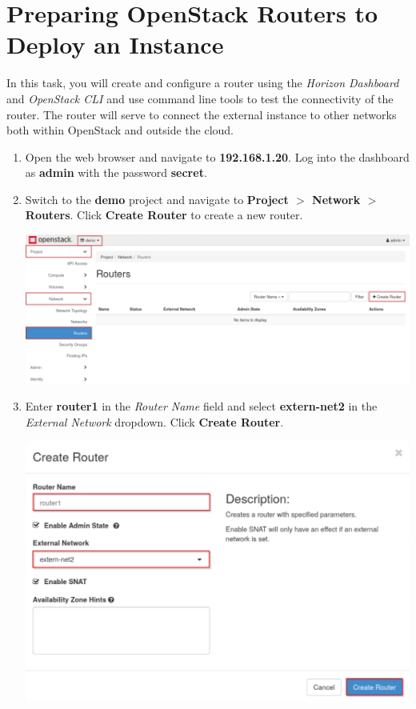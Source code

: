 \documentclass[letterpaper, 12pt]{article}
\begin{document}
\section{Preparing OpenStack Routers to Deploy an Instance}
\label{sec:preparing_openstack_routers_to_deploy_an_instance}
In this task, you will create and configure a router using the \textit{Horizon Dashboard} and \textit{OpenStack CLI} and use command line tools to test the connectivity of the router.
The router will serve to connect the external instance to other networks both within OpenStack and outside the cloud.

\begin{enumerate}
    \item Open the web browser and navigate to \textbf{192.168.1.20}.
    Log into the dashboard as \textbf{admin} with the password \textbf{secret}.

    \item Switch to the \textbf{demo} project and navigate to \textbf{Project $>$ Network $>$ Routers}.
    Click \textbf{Create Router} to create a new router.

    \begin{center}
        \includegraphics[width=\linewidth]{images/part2/step2.png}
    \end{center}

    \item Enter \textbf{router1} in the \textit{Router Name} field and select \textbf{extern-net2} in the \textit{External Network} dropdown.
    Click \textbf{Create Router}.

    \begin{center}
        \includegraphics[width=\linewidth]{images/part2/step3.png}
    \end{center}


\end{enumerate}
\end{document}
